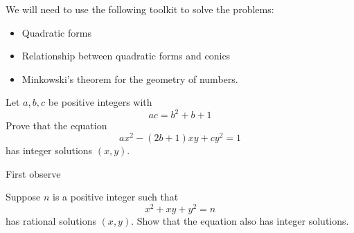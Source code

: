 \documentclass[12pt]{memoir}
\begin{document}
We will need to use the following toolkit to solve the problems:
\begin{itemize}
    \item Quadratic forms
    \item Relationship between quadratic forms and conics %
    \item Minkowski's theorem for the geometry of numbers.
\end{itemize}

\begin{Ej}
    Let $a,b,c$ be positive integers with 
    $$ac=b^2+b+1$$
    Prove that the equation 
    $$ax^2-(2b+1)xy+cy^2=1$$
    has integer solutions $(x,y)$.
\end{Ej}

\begin{ptcbr}
First observe 
\end{ptcbr}

\begin{Ej}
    Suppose $n$ is a positive integer such that 
    $$x^2+xy+y^2=n$$
    has rational solutions $(x,y)$. Show that the equation also has integer solutions.
\end{Ej}
\end{document}
